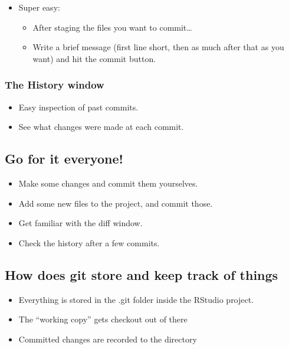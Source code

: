 \documentclass[]{book}
\providecommand{\tightlist}{%
  \setlength{\itemsep}{0pt}\setlength{\parskip}{0pt}}
\theoremstyle{definition}
\theoremstyle{definition}
\theoremstyle{remark}
\begin{document}
\begin{itemize}
\tightlist
\item
  Super easy:

  \begin{itemize}
  \tightlist
  \item
    After staging the files you want to commit\ldots{}
  \item
    Write a brief message (first line short, then as much after that as
    you want) and hit the commit button.
  \end{itemize}
\end{itemize}

\subsubsection{The History window}\label{the-history-window}

\begin{itemize}
\tightlist
\item
  Easy inspection of past commits.
\item
  See what changes were made at each commit.
\end{itemize}

\subsection{Go for it everyone!}\label{git-play}

\begin{itemize}
\tightlist
\item
  Make some changes and commit them yourselves.\\
\item
  Add some new files to the project, and commit those.
\item
  Get familiar with the diff window.
\item
  Check the history after a few commits.
\end{itemize}

\subsection{How does git store and keep track of things}\label{git-how}

\begin{itemize}
\tightlist
\item
  Everything is stored in the .git folder inside the RStudio project.
\item
  The ``working copy'' gets checkout out of there
\item
  Committed changes are recorded to the directory
\end{itemize}
\end{document}

